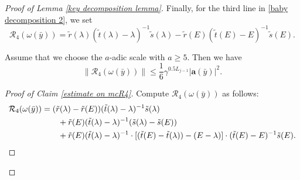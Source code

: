 \documentclass[10pt,a4paper]{amsart}
\newcommand{\bfa}{\mathbf{a}}
\newcommand{\mcR}{\mathcal{R}}
\newcommand{\tr}{\tilde{r}}
\newcommand{\ts}{\tilde{s}}
\renewcommand{\tt}{\tilde{t}}
\begin{document}
\begin{proof}[Proof of Lemma \ref{key decomposition lemma}]
Finally, for the third line in \eqref{baby decomposition 2}, we set 
\begin{equation}\label{mcR4}
  \mcR_4(\omega(\bar{y})) =\tr(\lambda) (\tt(\lambda)-\lambda)^{-1} \ts(\lambda)  -\tr(E) (\tt(E)-E)^{-1} \ts(E).
\end{equation}
\begin{claim}\label{estimate on mcR4}
  Assume that we choose the $a$-adic scale with $a\geq 5$. Then we have
  \[\|  \mcR_4(\omega(\bar{y}))  \| \leq \frac{1}{6}\gamma^{0.5L_{j-1}} |\bfa(\bar{y})|^2 .\]
\end{claim}
\begin{proof}[Proof of Claim \ref{estimate on mcR4}]
  Compute $\mcR_4(\omega(\bar{y}))$ as follows:
  \begin{align*}
    \mcR_4(\omega(\bar{y})) &=        (\tr(\lambda) -\tr(E)) (\tt(\lambda)-\lambda)^{-1} \ts(\lambda) \\
             \notag               &\qquad + \tr(E)(\tt(\lambda)-\lambda)^{-1} (\ts(\lambda)-\ts(E)) \\
                   \notag         &\qquad + \tr(E) (\tt(\lambda)-\lambda)^{-1} \cdot [(\tt(E)-\tt(\lambda))-(E-\lambda) ]\cdot (\tt(E)-E)^{-1} \ts(E).
  \end{align*}


\end{proof}
\end{proof}
\end{document}
